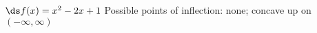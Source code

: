 {$\ds f(x) = x^2-2x+1$ \label{exer:03_04_ex_16}
}
{Possible points of inflection: none;
concave up on $(-\infty,\infty)$
}

